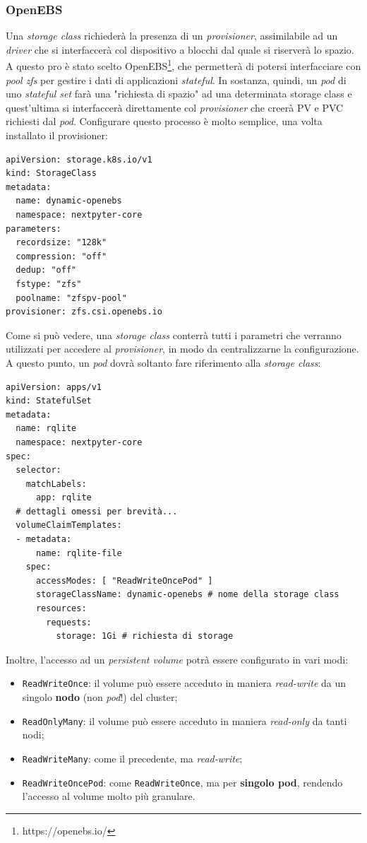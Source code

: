 \subsubsection{OpenEBS}
Una \textit{storage class} richiederà la presenza di un \textit{provisioner}, assimilabile ad un \textit{driver} che si interfaccerà col dispositivo a blocchi dal quale si riserverà lo spazio. A questo pro è stato scelto OpenEBS\footnote{https://openebs.io/}, che permetterà di potersi interfacciare con \textit{pool zfs} per gestire i dati di applicazioni \textit{stateful}.
\newline
In sostanza, quindi, un \textit{pod} di uno \textit{stateful set} farà una "richiesta di spazio" ad una determinata storage class e quest'ultima si interfaccerà direttamente col \textit{provisioner} che creerà PV e PVC richiesti dal \textit{pod}. Configurare questo processo è molto semplice, una volta installato il provisioner:
\begin{verbatim}
apiVersion: storage.k8s.io/v1
kind: StorageClass
metadata:
  name: dynamic-openebs
  namespace: nextpyter-core
parameters:
  recordsize: "128k"
  compression: "off"
  dedup: "off"
  fstype: "zfs"
  poolname: "zfspv-pool"
provisioner: zfs.csi.openebs.io 
\end{verbatim}
Come si può vedere, una \textit{storage class} conterrà tutti i parametri che verranno utilizzati per accedere al \textit{provisioner}, in modo da centralizzarne la configurazione.
\newline
A questo punto, un \textit{pod} dovrà soltanto fare riferimento alla \textit{storage class}:
\begin{verbatim}
apiVersion: apps/v1
kind: StatefulSet
metadata:
  name: rqlite
  namespace: nextpyter-core
spec:
  selector:
    matchLabels:
      app: rqlite 
  # dettagli omessi per brevità...
  volumeClaimTemplates:
  - metadata:
      name: rqlite-file
    spec:
      accessModes: [ "ReadWriteOncePod" ]
      storageClassName: dynamic-openebs # nome della storage class
      resources:
        requests:
          storage: 1Gi # richiesta di storage
\end{verbatim}
Inoltre, l'accesso ad un \textit{persistent volume} potrà essere configurato in vari modi:
\begin{itemize}
    \item \verb|ReadWriteOnce|: il volume può essere acceduto in maniera \textit{read-write} da un singolo \textbf{nodo} (non \textit{pod}!) del cluster;
    \item \verb|ReadOnlyMany|: il volume può essere acceduto in maniera \textit{read-only} da tanti nodi;
    \item \verb|ReadWriteMany|: come il precedente, ma \textit{read-write};
    \item \verb|ReadWriteOncePod|: come \verb|ReadWriteOnce|, ma per \textbf{singolo pod}, rendendo l'accesso al volume molto più granulare. 
\end{itemize}
\newpage
